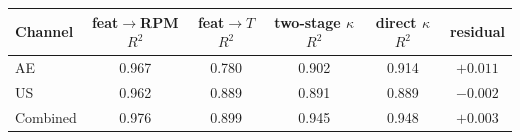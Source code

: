 \begin{tabular}{lccccc}
\toprule
Channel & feat$\to$RPM $R^2$ & feat$\to T$ $R^2$ & two-stage $\kappa$ $R^2$ & direct $\kappa$ $R^2$ & residual \\
\midrule
AE & 0.967 & 0.780 & 0.902 & 0.914 & $+0.011$ \\
US & 0.962 & 0.889 & 0.891 & 0.889 & $-0.002$ \\
Combined & 0.976 & 0.899 & 0.945 & 0.948 & $+0.003$ \\
\bottomrule
\end{tabular}

